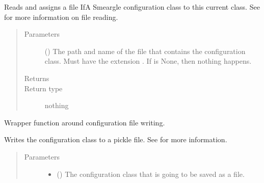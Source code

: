\documentclass[letterpaper,10pt,english]{sphinxmanual}
\begin{document}
\begin{fulllineitems}
\begin{fulllineitems}
Reads and assigns a file IfA Smeargle configuration class to this
current class. See  for more information on
file reading.
\begin{quote}\begin{description}
\item[{Parameters}] \leavevmode
{} () \textendash{} The path and name of the file that contains the configuration
class. Must have the extension . If 
is None, then nothing happens.

\item[{Returns}] \leavevmode


\item[{Return type}] \leavevmode
nothing

\end{description}\end{quote}

\end{fulllineitems}


\begin{fulllineitems}
\label{\detokenize{python_docstrings/IfA_Smeargle.yankee.configuration_classes.BaseConfig_file:IfA_Smeargle.yankee.configuration_classes.BaseConfig_file.BaseConfig.write_to_file}}
Wrapper function around configuration file writing.

Writes the configuration class to a pickle file. See
 for more information.
\begin{quote}\begin{description}
\item[{Parameters}] \leavevmode\begin{itemize}
\item {} 
 () \textendash{} The configuration class that is going to be saved as a file.


\end{itemize}
\end{description}
\end{quote}
\end{fulllineitems}
\end{fulllineitems}
\end{document}
